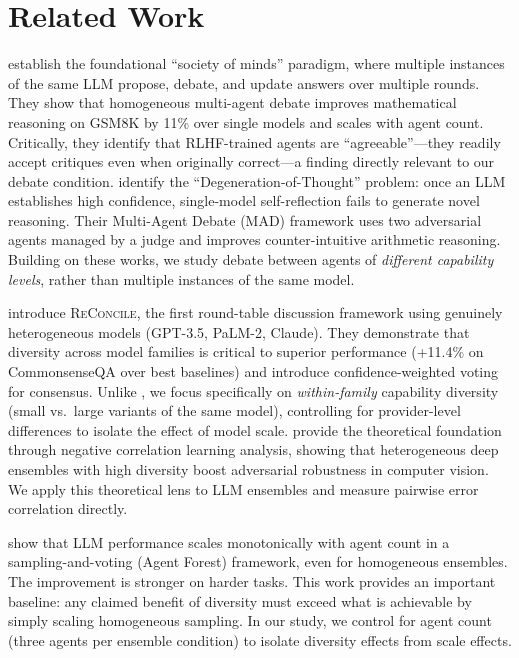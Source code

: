 \section{Related Work}
\label{sec:related}

\citet{du2023debate} establish the foundational ``society of minds'' paradigm,
where multiple instances of the same LLM propose, debate, and update answers over
multiple rounds. They show that homogeneous multi-agent debate improves mathematical
reasoning on GSM8K by 11\% over single models and scales with agent count.
Critically, they identify that RLHF-trained agents are ``agreeable''---they readily
accept critiques even when originally correct---a finding directly relevant to
our debate condition.
\citet{liang2023mad} identify the ``Degeneration-of-Thought'' problem: once an LLM
establishes high confidence, single-model self-reflection fails to generate novel
reasoning. Their Multi-Agent Debate (MAD) framework uses two adversarial agents
managed by a judge and improves counter-intuitive arithmetic reasoning.
Building on these works, we study debate between agents of \emph{different capability levels},
rather than multiple instances of the same model.

\citet{chen2023reconcile} introduce \textsc{ReConcile}, the first round-table discussion
framework using genuinely heterogeneous models (GPT-3.5, PaLM-2, Claude).
They demonstrate that diversity across model families is critical to superior
performance (+11.4\% on CommonsenseQA over best baselines) and introduce
confidence-weighted voting for consensus.
Unlike \citet{chen2023reconcile}, we focus specifically on \emph{within-family}
capability diversity (small vs.\ large variants of the same model), controlling
for provider-level differences to isolate the effect of model scale.
\citet{wu2023heterogeneous} provide the theoretical foundation through
negative correlation learning analysis, showing that heterogeneous deep ensembles
with high diversity boost adversarial robustness in computer vision.
We apply this theoretical lens to LLM ensembles and measure pairwise error
correlation directly.

\citet{li2024moreagents} show that LLM performance scales monotonically with
agent count in a sampling-and-voting (Agent Forest) framework,
even for homogeneous ensembles.
The improvement is stronger on harder tasks.
This work provides an important baseline: any claimed benefit of diversity
must exceed what is achievable by simply scaling homogeneous sampling.
In our study, we control for agent count (three agents per ensemble condition)
to isolate diversity effects from scale effects.

